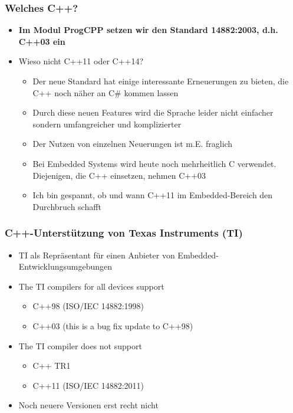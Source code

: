 \subsubsection{Welches C++?\hfill}
\label{sec:unterunterabschnitt}
\begin{itemize}
	\item \textbf{Im Modul ProgCPP setzen wir den Standard 14882:2003, d.h. C++03 ein}
	\item Wieso nicht C++11 oder C++14?
	\begin{itemize}
		\item Der neue Standard hat einige interessante Erneuerungen zu bieten, die C++ noch näher an C\# kommen lassen
		\item Durch diese neuen Features wird die Sprache leider nicht einfacher sondern umfangreicher und komplizierter
		\item Der Nutzen von einzelnen Neuerungen ist m.E. fraglich
		\item Bei Embedded Systems wird heute noch mehrheitlich C verwendet. Diejenigen, die C++ einsetzen, nehmen C++03
		\item Ich bin gespannt, ob und wann C++11 im Embedded-Bereich den Durchbruch schafft
	\end{itemize}
\end{itemize}

\subsubsection{C++-Unterstützung von Texas Instruments (TI)\hfill}
\label{sec:unterunterabschnitt}
\begin{itemize}
	\item TI als Repräsentant für einen Anbieter von Embedded-Entwicklungsumgebungen
	\item The TI compilers for all devices support
	\begin{itemize}
		\item C++98 (ISO/IEC 14882:1998)
		\item C++03 (this is a bug fix update to C++98)
	\end{itemize}
	\item The TI compiler does not support
	\begin{itemize}
		\item C++ TR1
		\item C++11 (ISO/IEC 14882:2011)
	\end{itemize}
	\item Noch neuere Versionen erst recht nicht
\end{itemize}

